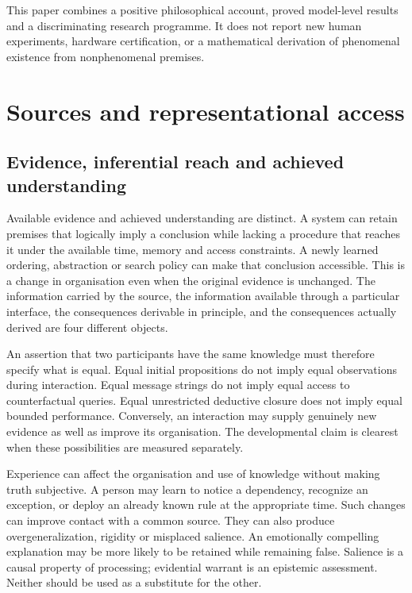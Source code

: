 \documentclass[
  11pt,
  a4paper,
]{article}
\begin{document}
This paper combines a positive philosophical account, proved model-level
results and a discriminating research programme. It does not report new
human experiments, hardware certification, or a mathematical derivation
of phenomenal existence from nonphenomenal premises.

\section{Sources and representational
access}\label{sources-and-representational-access}

\subsection{Evidence, inferential reach and achieved
understanding}\label{evidence-inferential-reach-and-achieved-understanding}

Available evidence and achieved understanding are distinct. A system can
retain premises that logically imply a conclusion while lacking a
procedure that reaches it under the available time, memory and access
constraints. A newly learned ordering, abstraction or search policy can
make that conclusion accessible. This is a change in organisation even
when the original evidence is unchanged. The information carried by the
source, the information available through a particular interface, the
consequences derivable in principle, and the consequences actually
derived are four different objects.

An assertion that two participants have the same knowledge must
therefore specify what is equal. Equal initial propositions do not imply
equal observations during interaction. Equal message strings do not
imply equal access to counterfactual queries. Equal unrestricted
deductive closure does not imply equal bounded performance. Conversely,
an interaction may supply genuinely new evidence as well as improve its
organisation. The developmental claim is clearest when these
possibilities are measured separately.

Experience can affect the organisation and use of knowledge without
making truth subjective. A person may learn to notice a dependency,
recognize an exception, or deploy an already known rule at the
appropriate time. Such changes can improve contact with a common source.
They can also produce overgeneralization, rigidity or misplaced
salience. An emotionally compelling explanation may be more likely to be
retained while remaining false. Salience is a causal property of
processing; evidential warrant is an epistemic assessment. Neither
should be used as a substitute for the other.
\end{document}
